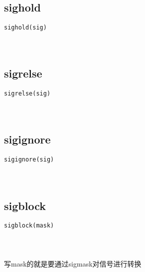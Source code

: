 \documentclass[10pt,a4paper]{article}
\begin{document}
\subsection{sighold}
\begin{spacing}{2.0}
\lstset{language=C,numbers=none}
\begin{lstlisting}
sighold(sig)
\end{lstlisting}
{\large\color[rgb]{0.2,0.4,0.6}{sig:}}
\paragraph{ \ \ }
\end{spacing}

\subsection{sigrelse}
\begin{spacing}{2.0}
\lstset{language=C,numbers=none}
\begin{lstlisting}
sigrelse(sig)
\end{lstlisting}
{\large\color[rgb]{0.2,0.4,0.6}{sig:}}
\paragraph{ \ \ }
\end{spacing}

\subsection{sigignore}
\begin{spacing}{2.0}
\lstset{language=C,numbers=none}
\begin{lstlisting}
sigignore(sig)
\end{lstlisting}
{\large\color[rgb]{0.2,0.4,0.6}{sig:}}
\paragraph{ \ \ }
\end{spacing}

\subsection{sigblock}
\begin{spacing}{2.0}
\lstset{language=C,numbers=none}
\begin{lstlisting}
sigblock(mask)
\end{lstlisting}
{\large\color[rgb]{0.2,0.4,0.6}{mask:}}
\paragraph{ \ \ }写mask的就是要通过sigmask对信号进行转换
\end{spacing}
\end{document}
